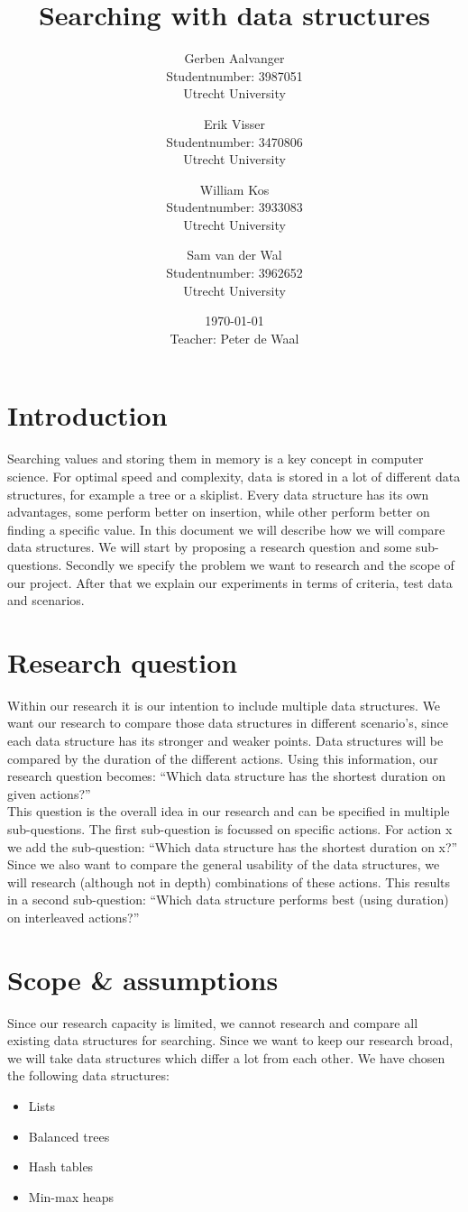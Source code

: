 \documentclass{article}
\title{Searching with data structures}
\author{
			Gerben Aalvanger\\ 
	        Studentnumber: 3987051 \\
	        Utrecht University
			\and
			Erik Visser\\
	        Studentnumber: 3470806 \\
	        Utrecht University
	        \and
	        William Kos\\
	        Studentnumber: 3933083\\
	        Utrecht University\\
	        \and
	        Sam van der Wal\\
	        Studentnumber: 3962652\\
	        Utrecht University}
\date{\today \\Teacher: Peter de Waal}
\begin{document}
\maketitle
\section{Introduction}
Searching values and storing them in memory is a key concept in computer science. For optimal speed and complexity, data is stored in a lot of different data structures, for example a tree or a skiplist. Every data structure has its own advantages, some perform better on insertion, while other perform better on finding a specific value. In this document we will describe how we will compare data structures. We will start by proposing a research question and some sub-questions. Secondly we specify the problem we want to research and the scope of our project. After that we explain our experiments in terms of criteria, test data and scenarios.

\section{Research question}
Within our research it is our intention to include multiple data structures. We want our research to compare those data structures in different scenario’s, since each data structure has its stronger and weaker points. Data structures will be compared by the duration of the different actions. Using this information, our research question becomes:
``Which data structure has the shortest duration on given actions?''\\

This question is the overall idea in our research and can be specified in multiple sub-questions. The first sub-question is focussed on specific actions. For action x we add the sub-question:
``Which data structure has the shortest duration on x?''
Since we also want to compare the general usability of the data structures, we will research (although not in depth) combinations of these actions. This results in a second sub-question:
``Which data structure performs best (using duration) on interleaved actions?''

\section{Scope \& assumptions}
Since our research capacity is limited, we cannot research and compare all existing data structures for searching. Since we want to keep our research broad, we will take data structures which differ a lot from each other. We have chosen the following data structures:
\begin{itemize}
\item Lists
\item Balanced trees
\item Hash tables
\item Min-max heaps
\end{itemize}
\end{document}
